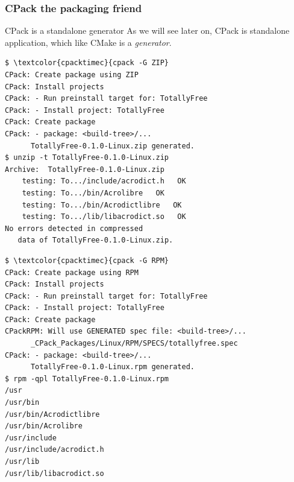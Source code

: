 \documentclass[compress,slidestop,table,usepdftitle=false
              ]
               {beamer}
\begin{document}
\begin{frame}[fragile]
\frametitle{CPack the packaging friend}
\begin{block}{CPack is a standalone generator}
As we will see later on, CPack is standalone application,
which like CMake is a \emph{generator}.
\end{block}
\vspace*{-0.5cm}
\begin{multicols}{2}
\begin{Verbatim}[commandchars=\\\{\},fontsize=\tiny]
$ \textcolor{cpacktimec}{cpack -G ZIP}
CPack: Create package using ZIP
CPack: Install projects
CPack: - Run preinstall target for: TotallyFree
CPack: - Install project: TotallyFree
CPack: Create package
CPack: - package: <build-tree>/...
      TotallyFree-0.1.0-Linux.zip generated.
$ unzip -t TotallyFree-0.1.0-Linux.zip
Archive:  TotallyFree-0.1.0-Linux.zip
    testing: To.../include/acrodict.h   OK
    testing: To.../bin/Acrolibre   OK
    testing: To.../bin/Acrodictlibre   OK
    testing: To.../lib/libacrodict.so   OK
No errors detected in compressed
   data of TotallyFree-0.1.0-Linux.zip.
\end{Verbatim}
\columnbreak
\begin{Verbatim}[commandchars=\\\{\},fontsize=\tiny]
$ \textcolor{cpacktimec}{cpack -G RPM}
CPack: Create package using RPM
CPack: Install projects
CPack: - Run preinstall target for: TotallyFree
CPack: - Install project: TotallyFree
CPack: Create package
CPackRPM: Will use GENERATED spec file: <build-tree>/...
      _CPack_Packages/Linux/RPM/SPECS/totallyfree.spec
CPack: - package: <build-tree>/...
      TotallyFree-0.1.0-Linux.rpm generated.
$ rpm -qpl TotallyFree-0.1.0-Linux.rpm 
/usr
/usr/bin
/usr/bin/Acrodictlibre
/usr/bin/Acrolibre
/usr/include
/usr/include/acrodict.h
/usr/lib
/usr/lib/libacrodict.so
\end{Verbatim}
\end{multicols}
\end{frame}
\end{document}
